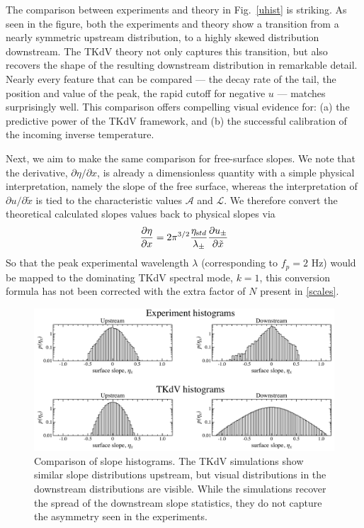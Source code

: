 \documentclass[11pt]{article}
\newcommand{\pd}[2]    { \frac{\partial #1} {\partial #2} }
\newcommand{\freqp}{f_p}
\newcommand{\etastd}{\eta_{\text std}}
\newcommand{\lam}{\lambda}
\newcommand{\lamupdn}{\lam_{\pm}}
\newcommand{\lamfac}{N}
\newcommand{\ampscale}{\mathcal{A}}
\newcommand{\lengthscale}{\mathcal{L}}
\newcommand{\uupdn}{u_{\pm}}
\begin{document}
	The comparison between experiments and theory in Fig.~\ref{uhist} is striking. As seen in the figure, both the experiments and theory show a transition from a nearly symmetric upstream distribution, to a highly skewed distribution downstream. The TKdV theory not only captures this transition, but also recovers the shape of the resulting downstream distribution in remarkable detail. Nearly every feature that can be compared --- the decay rate of the tail, the position and value of the peak, the rapid cutoff for negative $u$ --- matches surprisingly well. This comparison offers compelling visual evidence for: (a) the predictive power of the TKdV framework, and (b) the successful calibration of the incoming inverse temperature.


	Next, we aim to make the same comparison for free-surface slopes. We note that the derivative, $\partial \eta / \partial x$, is already a dimensionless quantity with a simple physical interpretation, namely the slope of the free surface, whereas the interpretation of $\partial u/\partial \tilde{x}$ is tied to the characteristic values $\ampscale$ and $\lengthscale$.  
We therefore convert the theoretical calculated slopes values back to physical slopes via
\begin{equation}
\pd{\eta}{x} = 2 \pi^{3/2} \frac{\etastd}{\lamupdn} \pd{\uupdn}{\tilde{x}}
\end{equation}
So that the peak experimental wavelength $\lam$ (corresponding to $\freqp = 2$ Hz) would be mapped to the dominating TKdV spectral mode, $k = 1$,  this conversion formula has not been corrected with the extra factor of $\lamfac$ present in \eqref{scales}.

\begin{figure}%
\begin{center}
\includegraphics[width = 0.99 \linewidth]{Figs/slopehist.pdf}
\caption{
Comparison of slope histograms. The TKdV simulations show similar slope distributions upstream, but visual distributions in the downstream distributions are visible. While the simulations recover the spread of the downstream slope statistics, they do not capture the asymmetry seen in the experiments.
}
\label{slopehist}
\end{center}
\end{figure}
 
\end{document}
